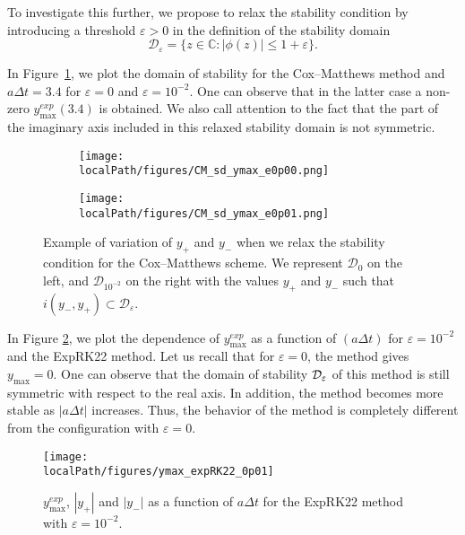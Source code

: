 To investigate this further, we propose to relax the stability condition by introducing a threshold $\varepsilon>0$ in the definition of the stability domain
\begin{equation}
  \label{d_eps}
	\mathcal{D}_\varepsilon = \{ z\in\mathbb{C} : |\phi(z)| \leq 1+\varepsilon \}. 
\end{equation}

In Figure~\ref{ymax_example}, we plot the domain of stability for the Cox--Matthews method and $a\Delta t = 3.4$ for $\varepsilon=0$ and $\varepsilon=10^{-2}$. One can observe that in the latter case a non-zero $y_{\max}^{exp}(3.4)$ is obtained. We also call attention to the fact that the part of the imaginary axis included in this relaxed stability domain is not symmetric. 

\begin{figure}[h]
  \centering
  \begin{subfigure}[b]{0.33\textwidth}
        \centering \texttt{[image: \\localPath/figures/CM\_sd\_ymax\_e0p00.png]}
  \end{subfigure}
  \begin{subfigure}[b]{0.33\textwidth}
        \centering \texttt{[image: \\localPath/figures/CM\_sd\_ymax\_e0p01.png]}
  \end{subfigure}
  \caption{Example of variation of $y_+$ and $y_-$ when we relax the stability condition for the Cox--Matthews scheme. We represent $\mathcal{D}_{0}$ on the left, and $\mathcal{D}_{10^{-2}}$ on the right with the values $y_+$ and $y_-$  such that 
  $i(y_-, y_+)\subset \mathcal{D}_{\varepsilon}$.}
  \label{ymax_example}
\end{figure}

In Figure \ref{ymax_expRK22}, we plot the dependence of $y^{exp}_{\max}$ as a function of $(a\Delta t)$ for $\varepsilon=10^{-2}$ and the ExpRK22 method. Let us recall that for $\varepsilon=0$, the method gives $y_{\max}=0$. One can observe that the  domain of stability ${\cal D}_\varepsilon$  of this method is still symmetric with respect to the real axis. In addition, the method becomes more stable as $|a\Delta t|$ increases. Thus, the behavior of the method is completely different from the configuration with $\varepsilon=0$.

\begin{figure}[h]
	\centering
	\texttt{[image: \\localPath/figures/ymax\_expRK22\_0p01]}
  \caption{$y^{exp}_{\max}$, $|y_+|$ and $|y_-|$ as a function of $a \Delta t$ for the ExpRK22 method with $\varepsilon=10^{-2}$. } 
	\label{ymax_expRK22}
\end{figure}

